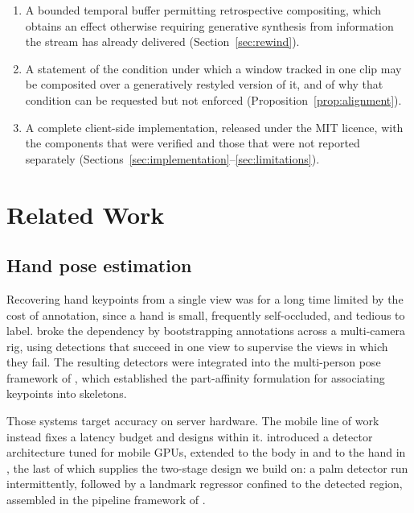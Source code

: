 \documentclass{article}
\theoremstyle{definition}
\begin{document}
\begin{enumerate}[leftmargin=*, topsep=2pt, itemsep=2pt]
        timestamp of its cause, making the smoothness of the response
        independent of inference throughput (Section~\ref{sec:decoupled}).
  \item A bounded temporal buffer permitting retrospective compositing, which
        obtains an effect otherwise requiring generative synthesis from
        information the stream has already delivered
        (Section~\ref{sec:rewind}).
  \item A statement of the condition under which a window tracked in one clip
        may be composited over a generatively restyled version of it, and of why
        that condition can be requested but not enforced
        (Proposition~\ref{prop:alignment}).
  \item A complete client-side implementation, released under the MIT licence,
        with the components that were verified and those that were not reported
        separately (Sections~\ref{sec:implementation}--\ref{sec:limitations}).
\end{enumerate}

\section{Related Work}

\subsection{Hand pose estimation}

Recovering hand keypoints from a single view was for a long time limited by the
cost of annotation, since a hand is small, frequently self-occluded, and tedious
to label. \citet{simon2017handkeypoint} broke the dependency by bootstrapping
annotations across a multi-camera rig, using detections that succeed in one view
to supervise the views in which they fail. The resulting detectors were
integrated into the multi-person pose framework of \citet{cao2018openpose},
which established the part-affinity formulation for associating keypoints into
skeletons.

Those systems target accuracy on server hardware. The mobile line of work
instead fixes a latency budget and designs within it. \citet{bazarevsky2019blazeface}
introduced a detector architecture tuned for mobile GPUs, extended to the body
in \citet{bazarevsky2020blazepose} and to the hand in
\citet{zhang2020mediapipehands}, the last of which supplies the two-stage design
we build on: a palm detector run intermittently, followed by a landmark
regressor confined to the detected region, assembled in the pipeline framework
of \citet{lugaresi2019mediapipe}.
\end{document}
